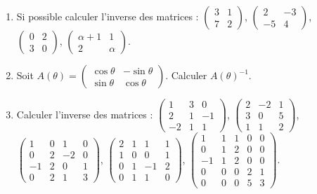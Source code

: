 \begin{frame}

\begin{miniexercice}
\begin{enumerate}
  \item Si possible calculer l'inverse des matrices :
  $\left(\begin{smallmatrix}3&1\\7&2\end{smallmatrix}\right)$,
  $\left(\begin{smallmatrix}2&-3\\-5&4\end{smallmatrix}\right)$,
  $\left(\begin{smallmatrix}0&2\\3&0\end{smallmatrix}\right)$,  
  $\left(\begin{smallmatrix}\alpha+1&1\\2&\alpha\end{smallmatrix}\right)$.
  
  \item Soit 
  $A(\theta)=\left(\begin{smallmatrix} \cos \theta & -\sin\theta \\ \sin\theta & \cos\theta\end{smallmatrix}\right)$.
  Calculer $A(\theta)^{-1}$.
  
  \item Calculer l'inverse des matrices :
  $\left(\begin{smallmatrix}1&3&0\\2&1&-1\\-2&1&1\end{smallmatrix}\right)$, 
  $\left(\begin{smallmatrix}2&-2&1\\3&0&5\\1&1&2\end{smallmatrix}\right)$, 
  $\left(\begin{smallmatrix}1&0&1&0\\0&2&-2&0\\-1&2&0&1\\0&2&1&3\end{smallmatrix}\right)$, 
  $\left(\begin{smallmatrix}2&1&1&1\\1&0&0&1\\0&1&-1&2\\0&1&1&0\end{smallmatrix}\right)$, 
  $\left(\begin{smallmatrix}1&1&1&0&0\\0&1&2&0&0\\-1&1&2&0&0\\0&0&0&2&1\\0&0&0&5&3\end{smallmatrix}\right)$.

\end{enumerate}
\end{miniexercice}

\end{frame}

